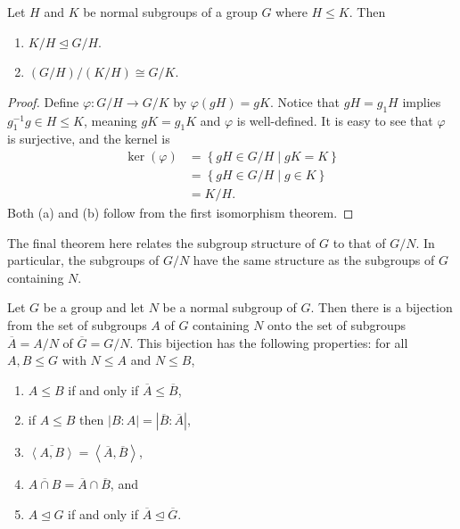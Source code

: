 \documentclass[../m171main.tex]{subfiles}
\begin{document}
\begin{theorem}
    Let $H$ and $K$ be normal subgroups of a group $G$ where $H \leq K$.
    Then
    \begin{enumerate}[label=(\alph*)]
        \item $K / H \trianglelefteq G / H$.
        \item $(G / H) / (K / H) \cong G / K$.
    \end{enumerate}
\end{theorem}

\begin{proof}
    Define $\varphi : G / H \to G / K$ by $\varphi(gH) = gK$.
    Notice that $gH = g_1H$ implies $g_1^{-1} g \in H \leq K$, meaning $gK = g_1 K$ and $\varphi$ is well-defined.
    It is easy to see that $\varphi$ is surjective, and the kernel is
    \begin{align*}
        \ker(\varphi) &= \left\{ gH \in G / H \;|\; gK = K \right\} \\
        &= \left\{ gH \in G / H \;|\; g \in K \right\} \\
        &= K / H.
    \end{align*}
    Both (a) and (b) follow from the first isomorphism theorem.
\end{proof}

The final theorem here relates the subgroup structure of $G$ to that of $G / N$.
In particular, the subgroups of $G / N$ have the same structure as the subgroups of $G$ containing $N$.

\begin{theorem}
    Let $G$ be a group and let $N$ be a normal subgroup of $G$.
    Then there is a bijection from the set of subgroups $A$ of $G$ containing $N$ onto the set of subgroups $\overline A = A / N$ of $\overline G = G / N$.
    This bijection has the following properties: for all $A,B \leq G$ with $N \leq A$ and $N \leq B$,
    \begin{enumerate}[label=(\alph*),topsep=0pt]
        \item $A \leq B$ if and only if $\overline A \leq \overline B$,
        \item if $A \leq B$ then $|B : A| = |\overline B : \overline A|$,
        \item $\overline{\left< A,B \right>} = \left< \overline A, \overline B \right>$,
        \item $\overline{A \cap B} = \overline A \cap \overline B$, and
        \item $A \trianglelefteq G$ if and only if $\overline A \trianglelefteq \overline G$.
    \end{enumerate}
\end{theorem}

\end{document}
